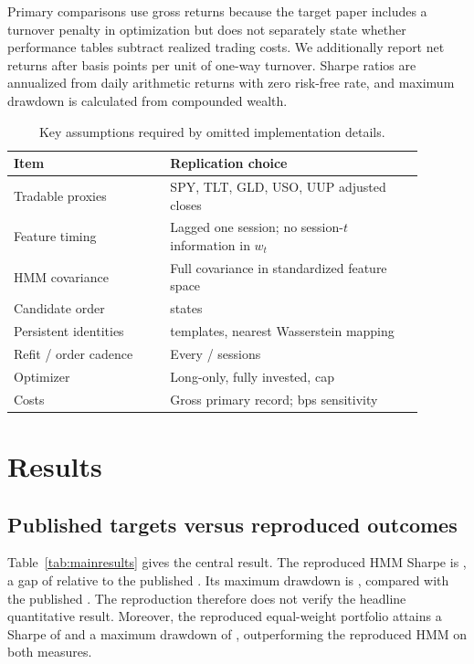 \documentclass[11pt]{article}
\begin{document}
Primary comparisons use gross returns because the target paper includes a turnover penalty in optimization but does not separately state whether performance tables subtract realized trading costs. We additionally report net returns after \RealizedCost{} basis points per unit of one-way turnover. Sharpe ratios are annualized from daily arithmetic returns with zero risk-free rate, and maximum drawdown is calculated from compounded wealth.

\begin{table}[H]
\centering
\caption{Key assumptions required by omitted implementation details.}
\label{tab:assumptions}
\begin{tabular}{p{0.34\linewidth}p{0.55\linewidth}}
\toprule
Item & Replication choice \\
\midrule
Tradable proxies & SPY, TLT, GLD, USO, UUP adjusted closes \\
Feature timing & Lagged one session; no session-\(t\) information in \(w_t\) \\
HMM covariance & Full covariance in standardized feature space \\
Candidate order & \CandidateStates{} states \\
Persistent identities & \TemplateCount{} templates, nearest Wasserstein mapping \\
Refit / order cadence & Every \RefitFrequency{} / \OrderFrequency{} sessions \\
Optimizer & Long-only, fully invested, \MaxWeight{} cap \\
Costs & Gross primary record; \RealizedCost{} bps sensitivity \\
\bottomrule
\end{tabular}
\end{table}

\section{Results}

\subsection{Published targets versus reproduced outcomes}

Table~\ref{tab:mainresults} gives the central result. The reproduced HMM Sharpe is \RepHMMSharpe{}, a gap of \HMMSharpeGap{} relative to the published \PubHMMSharpe{}. Its maximum drawdown is \RepHMMMaxDD{}, compared with the published \PubHMMMaxDD{}. The reproduction therefore does not verify the headline quantitative result. Moreover, the reproduced equal-weight portfolio attains a Sharpe of \RepEqualSharpe{} and a maximum drawdown of \RepEqualMaxDD{}, outperforming the reproduced HMM on both measures.
\end{document}
